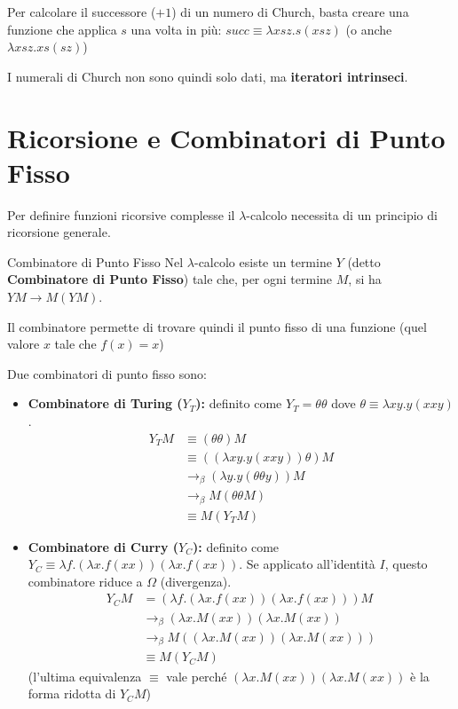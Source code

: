 \documentclass[a4paper,11pt]{report}
\begin{document}
Per calcolare il successore ($+1$) di un numero di Church, basta creare una funzione che applica $s$ una volta in più: $succ \equiv \lambda x s z. s(x s z)$ (o anche $\lambda x s z. xs (s z)$)

I numerali di Church non sono quindi solo dati, ma \textbf{iteratori intrinseci}.

\section{Ricorsione e Combinatori di Punto Fisso}
Per definire funzioni ricorsive complesse il $\lambda$-calcolo necessita di un principio di ricorsione generale. 

\begin{thmframe}{Combinatore di Punto Fisso}{}
 Nel $\lambda$-calcolo esiste un termine $Y$ (detto \textbf{Combinatore di Punto Fisso}) tale che, per ogni termine $M$, si ha $Y M \rightarrow M (Y M)$. 
 
 Il combinatore permette di trovare quindi il punto fisso di una funzione (quel valore $x$ tale che $f(x) = x$)
\end{thmframe}

Due combinatori di punto fisso sono:
\begin{itemize}
    \item \textbf{Combinatore di Turing ($Y_T$):} definito come $Y_T = \theta \theta$ dove $\theta \equiv \lambda x y. y(x x y)$.
\begin{align*}
Y_T M &\equiv (\theta \theta) M \\
&\equiv ((\lambda x y. y(x x y)) \theta) M \\
&\rightarrow_\beta (\lambda y. y(\theta \theta y)) M \\
&\rightarrow_\beta M (\theta \theta M) \\
&\equiv M (Y_T M)
\end{align*}

    \item \textbf{Combinatore di Curry ($Y_C$):} definito come $Y_C \equiv \lambda f. (\lambda x.f(xx))(\lambda x.f(xx))$. Se applicato all'identità $I$, questo combinatore riduce a $\Omega$ (divergenza).
    \begin{align*}
    Y_C M &= (\lambda f. (\lambda x. f(x x)) (\lambda x. f(x x))) M \\
    &\rightarrow_\beta (\lambda x. M(x x)) (\lambda x. M(x x)) \\
    &\rightarrow_\beta M ( (\lambda x. M(x x)) (\lambda x. M(x x)) ) \\
    &\equiv M (Y_C M)
    \end{align*}
    {\small \color{gray}(l'ultima equivalenza $\equiv$ vale perché $(\lambda x. M(x x)) (\lambda x. M(x x))$ è la forma ridotta di $Y_C M$)}

\end{itemize}
\end{document}
